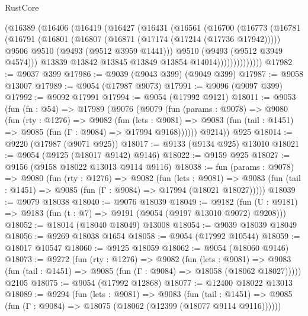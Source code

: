 \begin{lexlean}{RustCore}
\begin{coremodule}
              (@16389
                (@16406
                  (@16419
                    (@16427
                      (@16431
                        (@16561
                          (@16700
                            (@16773
                              (@16781
                                (@16791
                                  (@16801
                                    (@16807 (@16871 (@17174 (@17214 (@17736 @17942)))))
                                    @9506
                                    @9510
                                    (@9493 (@9512 @3959 @1441)))
                                  @9510
                                  (@9493 (@9512 @3949 @4574)))
                                @13839
                                @13842
                                @13845
                                @13849
                                @13854
                                @14014))))))))))))))
@17982 := @9037 @399
@17986 := @9039 (@9043 @399) (@9049 @399)
@17987 := @9058 @13007
@17989 := @9054 (@17987 @9073)
@17991 := @9096 (@9097 @399)
@17992 := @9092 @17991
@17994 := @9054 (@17992 @9121)
@18011 := @9053
    (fun (fn : @54) =>
    @17989
      (@9076
        (@9079
          (fun (params : @9078) =>
          @9080
            (fun (rty : @1276) =>
            @9082
              (fun (lets : @9081) =>
              @9083 (fun (tail : @1451) => @9085 (fun (Γ : @9084) => @17994 @9168))))))
        @9214))
    @925
@18014 := @9220 (@17987 (@9071 @925))
@18017 := @9133 (@9134 @925) @13010
@18021 := @9054 (@9125 (@18017 @9142) @9146)
@18022 := @9159 @925
@18027 := @9156 (@9158 @18022 @13013 @9114 @9116)
@18038 := fun (params : @9078) =>
  @9080
    (fun (rty : @1276) =>
    @9082
      (fun (lets : @9081) =>
      @9083 (fun (tail : @1451) => @9085 (fun (Γ : @9084) => @17994 (@18021 @18027)))))
@18039 := @9079 @18038
@18040 := @9076 @18039
@18049 := @9182
    (fun (U : @9181) => @9183 (fun (t : @7) => @9191 (@9054 (@9197 @13010 @9072) @9208)))
@18052 := @18014 (@18040 @18049) @13008
@18054 := @9039 @18039 @18049
@18056 := @9269 @18038 @1654
@18058 := @9054 (@17992 @10544)
@18059 := @18017 @10547
@18060 := @9125 @18059
@18062 := @9054 (@18060 @9146)
@18073 := @9272
    (fun (rty : @1276) =>
    @9082
      (fun (lets : @9081) =>
      @9083 (fun (tail : @1451) => @9085 (fun (Γ : @9084) => @18058 (@18062 @18027)))))
    @2105
@18075 := @9054 (@17992 @12868)
@18077 := @12400 @18022 @13013
@18089 := @9294
    (fun (lets : @9081) =>
    @9083
      (fun (tail : @1451) =>
      @9085 (fun (Γ : @9084) => @18075 (@18062 (@12399 (@18077 @9114 @9116))))))

\end{coremodule}
\end{lexlean}
